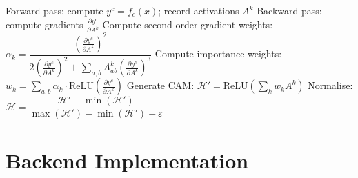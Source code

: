 \begin{algorithm}[H]
\SetAlgoLined
{}

Forward pass: compute $y^c = f_c(x)$; record activations $A^k$\;
Backward pass: compute gradients $\frac{\partial y^c}{\partial A^k}$\;
Compute second-order gradient weights:
  $\alpha_k = \dfrac{\left(\frac{\partial y^c}{\partial A^k}\right)^2}{2\left(\frac{\partial y^c}{\partial A^k}\right)^2 + \sum_{a,b} A^k_{ab} \left(\frac{\partial y^c}{\partial A^k}\right)^3}$\;
Compute importance weights: $w_k = \sum_{a,b} \alpha_k \cdot \mathrm{ReLU}\!\left(\frac{\partial y^c}{\partial A^k}\right)$\;
Generate CAM: $\mathcal{H}' = \mathrm{ReLU}\!\left(\sum_k w_k A^k\right)$\;
Normalise: $\mathcal{H} = \dfrac{\mathcal{H}' - \min(\mathcal{H}')}{\max(\mathcal{H}') - \min(\mathcal{H}') + \varepsilon}$\;
\caption{GradCAM++ Saliency Map Extraction}
\label{alg:gradcam}
\end{algorithm}

\section{Backend Implementation}

